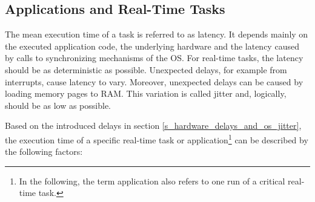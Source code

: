 \subsection{Applications and Real-Time Tasks}
The mean execution time of a task is referred to as latency.
It depends mainly on the executed application code, the underlying hardware and the latency caused by calls to synchronizing mechanisms of the \ac{OS}. 
For real-time tasks, the latency should be as deterministic as possible.
Unexpected delays, for example from interrupts, cause latency to vary.
Moreover, unexpected delays can be caused by loading memory pages to \ac{RAM}.
This variation is called jitter and, logically, should be as low as possible. 
\par
Based on the introduced delays in section \ref{s_hardware_delays_and_os_jitter}, the execution time of a specific real-time task or application\footnote{In the following, the term application also refers to one run of a critical real-time task.} can be described by the following factors:
